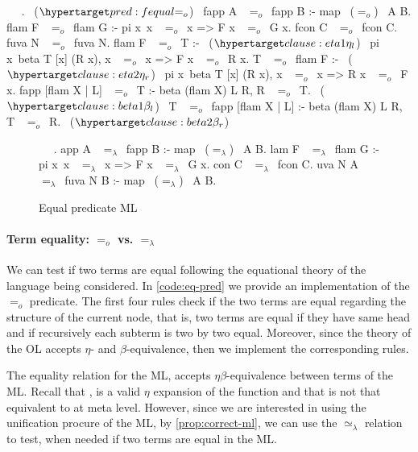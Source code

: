 \documentclass[sigconf,natbib=false]{acmart}
\newcommand{\EqualRel}{\ensuremath{=}}
\newcommand{\UnifRel}{\ensuremath{\simeq}}
\newcommand{\Eo}{\ensuremath{\EqualRel_o}\xspace}
\newcommand{\Ue}{\ensuremath{\UnifRel_\lambda}\xspace}
\newcommand{\Ee}{\ensuremath{\EqualRel_\lambda}\xspace}
\begin{document}
\begin{elpicode}
  ~ \PYG{n+nf}{(\Eo)} ~.                           ~($\customlabel{pred:fequal}{\Eo}$)~
  fapp A ~\Eo~fapp B :- map ~(\Eo)~ A B.
  flam F ~\Eo~flam G :- pi x\ x ~\Eo~x => F x ~\Eo~G x.
  fcon C ~\Eo~fcon C.
  fuva N ~\Eo~fuva N.
  flam F ~\Eo~T :-                                       ~($\customlabel{clause:eta1}{\eta_l}$)~
    pi x\ beta T [x] (R x), x ~\Eo~x => F x ~\Eo~R x.
  T ~\Eo~flam F :-                                       ~($\customlabel{clause:eta2}{\eta_r}$)~
    pi x\ beta T [x] (R x), x ~\Eo~x => R x ~\Eo~F x.
  fapp [flam X | L] ~\Eo~T :- beta (flam X) L R, R ~\Eo~T. ~($\customlabel{clause:beta1}{\beta_l}$)~
  T ~\Eo~fapp [flam X | L] :- beta (flam X) L R, T ~\Eo~R. ~($\customlabel{clause:beta2}{\beta_r}$)~
\end{elpicode}

\begin{figure}
  \begin{elpicode}
    ~ \PYG{n+nf}{(\Ee)} ~.
    app A ~\Ee~fapp B :- map ~(\Ee)~ A B.
    lam F ~\Ee~flam G :- pi x\ x ~\Ee~x => F x ~\Ee~G x.
    con C ~\Ee~fcon C.
    uva N A ~\Ee~fuva N B :- map ~(\Ee)~ A B.
  \end{elpicode}
  \caption{Equal predicate ML}
  \label{code:eq-pred-meta}
\end{figure}

\paragraph{Term equality: \Eo vs. \Ee} We can test if two terms are equal
following the equational theory of the language being considered. In
\cref{code:eq-pred} we provide an implementation of the \Eo predicate. The first
four rules check if the two terms are equal regarding the structure of the
current node, that is, two terms are equal if they have same head and if
recursively each subterm is two by two equal. Moreover, since the theory of the
OL accepts $\eta$- and $\beta$-equivalence, then we implement the corresponding
rules.

\noindent
The equality relation for the ML, accepts $\eta\beta$-equivalence between terms
of the ML. Recall that , is a valid $\eta$ expansion of the
function  and that  is not that equivalent to
 at meta level. However, since we are interested in using the
unification procure of the ML, by \cref{prop:correct-ml}, we can use the
\Ue relation to test, when needed if two terms are equal in the ML.
\end{document}
